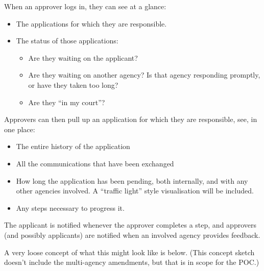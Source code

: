 \documentclass[12pt,a4paper,twosided]{article}
\begin{document}
When an approver logs in, they can see at a glance:

\begin{itemize}
\itemsep1pt\parskip0pt
\item
  The applications for which they are responsible.
\item
  The status of those applications:

  \begin{itemize}
  \itemsep1pt\parskip0pt
  \item
    Are they waiting on the applicant?
  \item
    Are they waiting on another agency? Is that agency responding
    promptly, or have they taken too long?
  \item
    Are they ``in my court''?
  \end{itemize}
\end{itemize}

Approvers can then pull up an application for which they are
responsible, see, in one place:

\begin{itemize}
\itemsep1pt\parskip0pt
\item
  The entire history of the application
\item
  All the communications that have been exchanged
\item
  How long the application has been pending, both internally, and with
  any other agencies involved. A ``traffic light'' style visualisation
  will be included.
\item
  Any steps necessary to progress it.
\end{itemize}

The applicant is notified whenever the approver completes a step, and
approvers (and possibly applicants) are notified when an involved agency
provides feedback.

A very loose concept of what this might look like is below. (This
concept sketch doesn't include the multi-agency amendments, but that is
in scope for the POC.)
\end{document}

